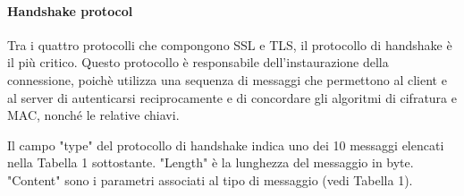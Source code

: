 \documentclass{article}
\theoremstyle{definition}
\begin{document}


\paragraph{Handshake protocol} %
Tra i quattro protocolli che compongono SSL e TLS, il protocollo di handshake è il più critico. Questo protocollo è responsabile dell'instaurazione della connessione, poichè utilizza una sequenza di messaggi che permettono al client e al server di autenticarsi reciprocamente e di concordare gli algoritmi di cifratura e MAC, nonché le relative chiavi. 

Il campo "type" del protocollo di handshake indica uno dei 10 messaggi elencati nella Tabella 1 sottostante. "Length" è la lunghezza del messaggio in byte. "Content" sono i parametri associati al tipo di messaggio (vedi Tabella 1).
\end{document}
